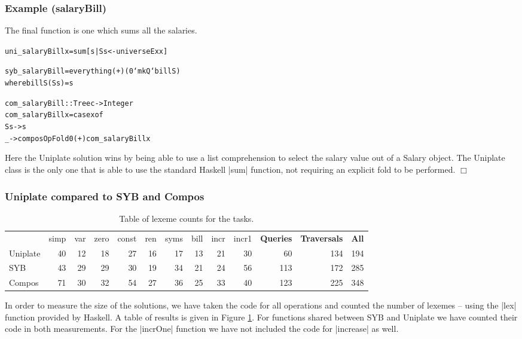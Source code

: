\documentclass[preprint]{sigplanconf}
\newcounter{exmp}
\newcommand{\noexample}{\hfill$\Box$}
\newenvironment{code}{\begin{alltt}\small}{\end{alltt}}
\newenvironment{examplename}[1]
    {\subsubsection*{Example \arabic{exmp} (#1)}\refstepcounter{exmp}}
    {\noexample}
\newcommand{\ignore}{}
\begin{document}
\begin{examplename}{salaryBill}

The final function is one which sums all the salaries.

\ignore\begin{code}
uni_salaryBill x = sum [s | S s <- universeEx x]

syb_salaryBill = everything (+) (0 `mkQ` billS)
   where billS (S s) = s

com_salaryBill :: Tree c -> Integer
com_salaryBill x = case x of
    S s -> s
    _ -> composOpFold 0 (+) com_salaryBill x
\end{code}

Here the Uniplate solution wins by being able to use a list comprehension to select the salary value out of a Salary object. The Uniplate class is the only one that is able to use the standard Haskell |sum| function, not requiring an explicit fold to be performed.
\end{examplename}

\subsubsection{Uniplate compared to SYB and Compos}

\newlength{\maxwidth}
\settowidth{\maxwidth}{Uniplate Typeable}

\begin{table}
\caption{Table of lexeme counts for the tasks.}
\label{fig:lexemes}
\vspace{3mm}
\begin{tabular*}{\textwidth}{lrrrrrrrrrrrr}
\hspace{\maxwidth} & simp & var & zero & const & ren & syms & bill & incr & incr1 & \textbf{Queries} & \textbf{Traversals} & \textbf{All} \\
Uniplate   & 40 & 12 & 18 & 27 & 16 & 17 & 13 & 21 & 30 &  60 & 134 & 194 \\
SYB        & 43 & 29 & 29 & 30 & 19 & 34 & 21 & 24 & 56 & 113 & 172 & 285 \\
Compos     & 71 & 30 & 32 & 54 & 27 & 36 & 25 & 33 & 40 & 123 & 225 & 348 \\
\hline
\end{tabular*}
\end{table}

In order to measure the size of the solutions, we have taken the code for all operations and counted the number of lexemes -- using the |lex| function provided by Haskell. A table of results is given in Figure \ref{fig:lexemes}. For functions shared between SYB and Uniplate we have counted their code in both measurements. For the |incrOne| function we have not included the code for |increase| as well.
\end{document}
